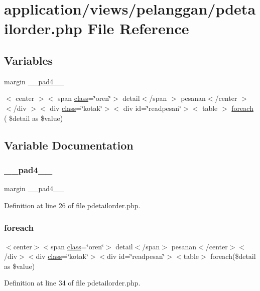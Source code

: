 \hypertarget{pdetailorder_8php}{}\section{application/views/pelanggan/pdetailorder.php File Reference}
\label{pdetailorder_8php}
\subsection*{Variables}
\begin{DoxyCompactItemize}
\item 
margin \mbox{\hyperlink{pdetailorder_8php_aa08effcccd9a550a438a77b7a69613a0}{\+\_\+\+\_\+pad4\+\_\+\+\_\+}}
\item 
$<$ center $>$$<$ span \mbox{\hyperlink{waiter_2olaporan_8php_a185c73c6507391d1eb38c776b68ce96d}{class}}=\char`\"{}oren\char`\"{}$>$ detail$<$/span $>$ pesanan$<$/center $>$$<$/div $>$$<$ div \mbox{\hyperlink{waiter_2olaporan_8php_a185c73c6507391d1eb38c776b68ce96d}{class}}=\char`\"{}kotak\char`\"{}$>$$<$ div id=\char`\"{}readpesan\char`\"{}$>$$<$ table $>$ \mbox{\hyperlink{pdetailorder_8php_a2e23c42e9b59be6e2bbc1bac76422d34}{foreach}} ( \$detail as \$value)
\end{DoxyCompactItemize}


\subsection{Variable Documentation}
\mbox{\label{pdetailorder_8php_aa08effcccd9a550a438a77b7a69613a0}} 
\subsubsection{\texorpdfstring{\_\_pad4\_\_}{\_\_pad4\_\_}}
{\footnotesize\ttfamily margin \+\_\+\+\_\+pad4\+\_\+\+\_\+}



Definition at line 26 of file pdetailorder.\+php.

\mbox{\label{pdetailorder_8php_a2e23c42e9b59be6e2bbc1bac76422d34}} 
\subsubsection{\texorpdfstring{foreach}{foreach}}
{\footnotesize\ttfamily $<$center$>$$<$span \mbox{\hyperlink{waiter_2olaporan_8php_a185c73c6507391d1eb38c776b68ce96d}{class}}=\char`\"{}oren\char`\"{}$>$ detail$<$/span$>$ pesanan$<$/center$>$$<$/div$>$$<$div \mbox{\hyperlink{waiter_2olaporan_8php_a185c73c6507391d1eb38c776b68ce96d}{class}}=\char`\"{}kotak\char`\"{}$>$$<$div id=\char`\"{}readpesan\char`\"{}$>$$<$table$>$ foreach(\$detail as \$value)}



Definition at line 34 of file pdetailorder.\+php.

